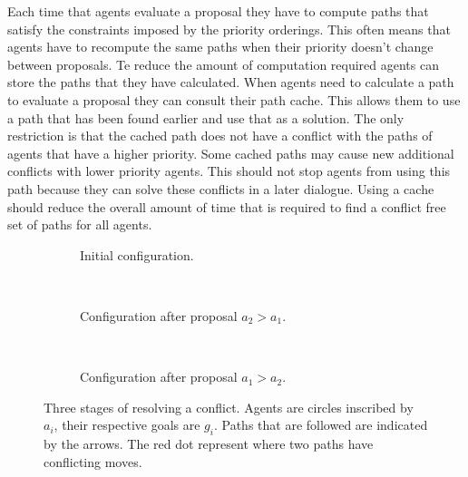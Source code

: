 Each time that agents evaluate a proposal they have to compute paths that
satisfy the constraints imposed by the priority orderings. This often means
that agents have to recompute the same paths when their priority doesn't change
between proposals. Te reduce the amount of computation required agents can
store the paths that they have calculated. When agents need to calculate a path
to evaluate a proposal they can consult their path cache. This allows them to
use a path that has been found earlier and use that as a solution. The only
restriction is that the cached path does not have a conflict with the paths of
agents that have a higher priority. Some cached paths may cause new additional
conflicts with lower priority agents. This should not stop agents from using
this path because they can solve these conflicts in a later dialogue. Using a
cache should reduce the overall amount of time that is required to find a
conflict free set of paths for all agents.

\begin{figure*}
    \centering
    \begin{subfigure}[t]{.3\textwidth}
        \centering
        \def\svgscale{.6}
        
        \caption{Initial configuration.}
        \label{fig:example-initial}
    \end{subfigure}
    ~
    \begin{subfigure}[t]{.3\textwidth}
        \centering
        \def\svgscale{.6}
        
        \caption{Configuration after proposal $a_2 > a_1$.}
        \label{fig:example-prop1}
    \end{subfigure}
    ~
    \begin{subfigure}[t]{.3\textwidth}
        \centering
        \def\svgscale{.6}
        
        \caption{Configuration after proposal $a_1 > a_2$.}
        \label{fig:example-solution}
    \end{subfigure}
    \caption{Three stages of resolving a conflict. Agents are circles inscribed
    by $a_i$, their respective goals are $g_i$. Paths that are followed are
    indicated by the arrows. The red dot represent where two paths have
    conflicting moves.}
    \label{fig:example}
\end{figure*}

